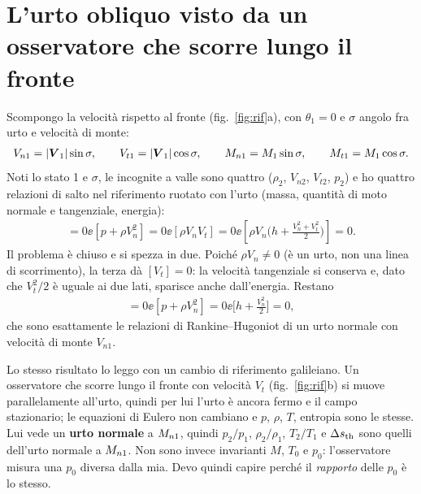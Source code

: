 \section*{L'urto obliquo visto da un osservatore che scorre lungo il fronte}
Scompongo la velocità rispetto al fronte (fig.~\ref{fig:rif}a), con $\theta_1=0$ e $\sigma$ angolo fra urto e
velocità di monte:
\begin{gather*}
  V_{n1}=|\boldsymbol V_1|\sin\sigma ,\qquad V_{t1}=|\boldsymbol V_1|\cos\sigma ,\qquad
  M_{n1}=M_1\sin\sigma ,\qquad M_{t1}=M_1\cos\sigma .
\end{gather*}
Noti lo stato 1 e $\sigma$, le incognite a valle sono quattro ($\rho_2$, $V_{n2}$, $V_{t2}$, $p_2$) e ho quattro
relazioni di salto nel riferimento ruotato con l'urto (massa, quantità di moto normale e tangenziale, energia):
\begin{gather*}
  [\rho V_n]=0 \ee [p+\rho V_n^2]=0 \ee [\rho V_n V_t]=0 \ee
  \left[\rho V_n\Big(h+\frac{V_n^2+V_t^2}{2}\Big)\right]=0 .
\end{gather*}
Il problema è chiuso e si spezza in due. Poiché $\rho V_n\neq0$ (è un urto, non una linea di scorrimento), la
terza dà $[V_t]=0$: la velocità tangenziale si conserva e, dato che $V_t^2/2$ è uguale ai due lati, sparisce
anche dall'energia. Restano
\begin{gather*}
  [\rho V_n]=0 \ee [p+\rho V_n^2]=0 \ee \Big[h+\frac{V_n^2}{2}\Big]=0,
\end{gather*}
che sono esattamente le relazioni di Rankine--Hugoniot di un urto normale con velocità di monte $V_{n1}$.

Lo stesso risultato lo leggo con un cambio di riferimento galileiano. Un osservatore che scorre lungo il fronte con
velocità $V_t$ (fig.~\ref{fig:rif}b) si muove parallelamente all'urto, quindi per lui l'urto è ancora fermo e il campo
stazionario; le equazioni di Eulero non cambiano e $p$, $\rho$, $T$, entropia sono le stesse. Lui vede un
\textbf{urto normale} a $M_{n1}$, quindi $p_2/p_1$, $\rho_2/\rho_1$, $T_2/T_1$ e $\Delta s_{\rm th}$ sono quelli dell'urto
normale a $M_{n1}$. Non sono invece invarianti $M$, $T_0$ e $p_0$: l'osservatore misura una $p_0$ diversa dalla mia.
Devo quindi capire perché il \emph{rapporto} delle $p_0$ è lo stesso.


